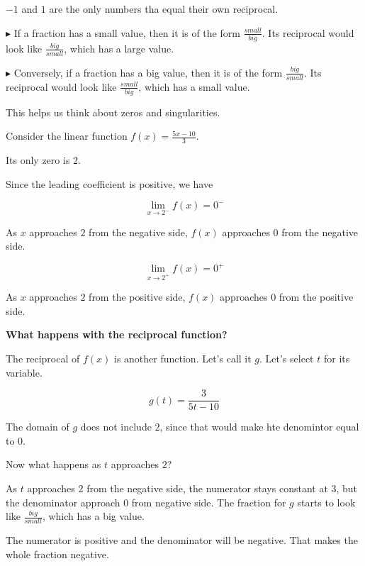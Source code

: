 \documentclass{ximera}
\begin{document}
$-1$ and $1$ are the only numbers tha equal their own reciprocal. 





$\blacktriangleright$ If a fraction has a small value, then it is of the form $\frac{small}{big}$.  Its reciprocal would look like $\frac{big}{small}$, which has a large value. 



$\blacktriangleright$ Conversely, if a fraction has a big value, then it is of the form $\frac{big}{small}$.  Its reciprocal would look like $\frac{small}{big}$, which has a small value. 




This helps us think about zeros and singularities.



\begin{example}

Consider the linear function $f(x) = \frac{5x - 10}{3}$. 

Its only zero is $2$. 

Since the leading coefficient is positive, we have


\[
\lim\limits_{x \to 2^-}f(x) = 0^-
\]


As $x$ approaches $2$ from the negative side, $f(x)$ approaches $0$ from the negative side.





\[
\lim\limits_{x \to 2^+}f(x) = 0^+
\]


As $x$ approaches $2$ from the positive side, $f(x)$ approaches $0$ from the positive side.


\textbf{\textcolor{blue!55!black}{What happens with the reciprocal function?}} 

The reciprocal of $f(x)$ is another function.  Let's call it $g$.  Let's select $t$ for its variable.


\[
g(t) = \frac{3}{5t - 10}
\]


The domain of $g$ does not include $2$, since that would make hte denomintor equal to $0$. 


Now what happens as $t$ approaches $2$? 

As $t$ approaches $2$ from the negative side, the numerator stays constant at $3$, but the denominator approach $0$ from negative side.  The fraction for $g$ starts to look like $\frac{big}{small}$, which has a big value. 

The numerator is positive and the denominator will be negative.  That makes the whole fraction negative.  



\end{example}
\end{document}
